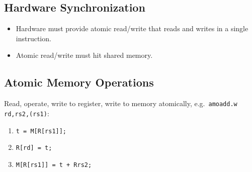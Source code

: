 \subsection{Hardware Synchronization}
\begin{itemize}
    \item Hardware must provide atomic read/write that reads and writes in a single instruction.
    \item Atomic read/write must hit shared memory.
\end{itemize}

\subsection{Atomic Memory Operations}
Read, operate, write to register, write to memory atomically, e.g.~\texttt{amoadd.w rd,rs2,(rs1)}:
\begin{enumerate}
	\item \texttt{t = M[R[rs1]];}
	\item \texttt{R[rd] = t;}
	\item \texttt{M[R[rs1]] = t + R{rs2};}
\end{enumerate}